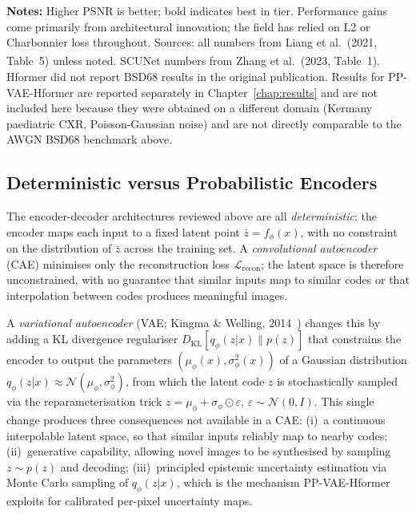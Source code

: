 \documentclass[12pt, a4paper, twoside, openright]{book}
\begin{document}
\begin{table}[H]
  \vspace{0.4em}
  {\footnotesize \textbf{Notes:} Higher PSNR is better; bold indicates best in tier.
  Performance gains come primarily from architectural innovation; the field has relied on
  L2 or Charbonnier loss throughout. Sources: all numbers from Liang et al.\ (2021, Table~5)
  unless noted. \textsuperscript{\dag}SCUNet numbers from Zhang et al.\ (2023, Table~1).
  Hformer did not report BSD68 results in the original publication.
  Results for PP-VAE-Hformer are reported separately in Chapter~\ref{chap:results} and are
  not included here because they were obtained on a different domain (Kermany paediatric CXR,
  Poisson-Gaussian noise) and are not directly comparable to the AWGN BSD68 benchmark above.}
\end{table}
\subsection{Deterministic versus Probabilistic Encoders}

The encoder-decoder architectures reviewed above are all \emph{deterministic}: the encoder maps each input to a fixed latent point $\bar{z} = f_\phi(x)$, with no constraint on the distribution of $\bar{z}$ across the training set. A \emph{convolutional autoencoder} (CAE) minimises only the reconstruction loss $\mathcal{L}_{\mathrm{recon}}$; the latent space is therefore unconstrained, with no guarantee that similar inputs map to similar codes or that interpolation between codes produces meaningful images.

A \emph{variational autoencoder} (VAE; Kingma \& Welling, 2014~\cite{kingma_auto-encoding_2014}) changes this by adding a KL divergence regulariser $D_{\mathrm{KL}}[q_\phi(z|x) \| p(z)]$ that constrains the encoder to output the parameters $(\mu_\phi(x), \sigma^2_\phi(x))$ of a Gaussian distribution $q_\phi(z|x) \approx \mathcal{N}(\mu_\phi, \sigma^2_\phi)$, from which the latent code $z$ is stochastically sampled via the reparameterisation trick $z = \mu_\phi + \sigma_\phi \odot \varepsilon$, $\varepsilon \sim \mathcal{N}(0,I)$. This single change produces three consequences not available in a CAE: (i)~a continuous interpolable latent space, so that similar inputs reliably map to nearby codes; (ii)~generative capability, allowing novel images to be synthesised by sampling $z \sim p(z)$ and decoding; (iii)~principled epistemic uncertainty estimation via Monte Carlo sampling of $q_\phi(z|x)$, which is the mechanism PP-VAE-Hformer exploits for calibrated per-pixel uncertainty maps.
\end{document}
